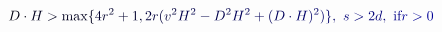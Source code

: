 \documentclass[12pt]{article}
\begin{document}
\makeatletter
\renewcommand*{\@textcolor}[3]{%
  \protect\leavevmode
  \begingroup
    \color#1{#2}#3%
  \endgroup
}
\makeatother
\begin{displaymath}
\mathcolor[RGB]{0,0,15}{D\cdot} \mathcolor[RGB]{0,0,30}{H>\max\{} \mathcolor[RGB]{0,0,45}{4r^2+1,} \mathcolor[RGB]{0,0,60}{2r(v^2} \mathcolor[RGB]{0,0,75}{H^2-D^2} \mathcolor[RGB]{0,0,90}{H^2+(D\cdot} \mathcolor[RGB]{0,0,105}{H)^2)\},}  \mathcolor[RGB]{0,0,120}{~s>2d,}  \mathcolor[RGB]{0,0,135}{\hbox{~if} \mathcolor[RGB]{0,0,150}{r>0}}
\end{displaymath}
\end{document}
